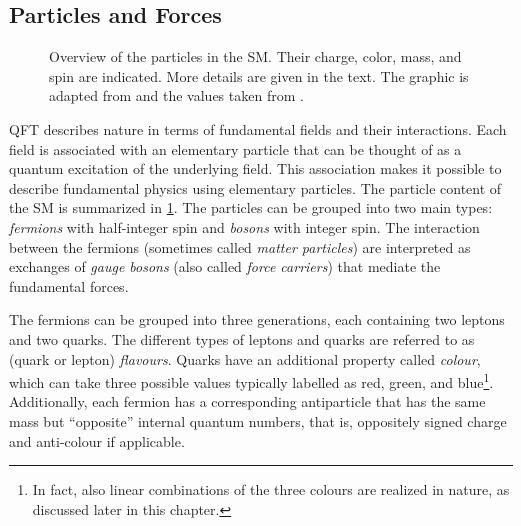 \subsection{Particles and Forces}
\label{subsec:particle-content}

\begin{figure}
  \caption[Overview of particles in the SM.]{Overview of the particles in the SM. Their charge, color, mass, and spin are indicated. More details are given in the text. The graphic is adapted from  and the values taken from .}  
  \label{fig:particles-infographic}
\end{figure}

QFT describes nature in terms of fundamental fields and their interactions. Each field is associated with an elementary particle that can be thought of as a quantum excitation of the underlying field. 
This association makes it possible to describe fundamental physics using elementary particles.
The particle content of the SM is summarized in \cref{fig:particles-infographic}. The particles can be grouped into two main types: 
\emph{fermions} with half-integer spin and \emph{bosons} with integer spin. The interaction between the fermions (sometimes called \emph{matter particles}) are interpreted as exchanges of \emph{gauge bosons} (also called \emph{force carriers}) that mediate the fundamental forces. 

The fermions can be grouped into three generations, each containing two leptons and two quarks. The different types of leptons and quarks are referred to as (quark or lepton) \emph{flavours}.
Quarks have an additional property called \emph{colour}, which can take three possible values typically labelled as red, green, and blue\footnote{In fact, also linear combinations of the three colours are realized in nature, as discussed later in this chapter.}.
Additionally, each fermion has a corresponding antiparticle that has the same mass but ``opposite'' internal quantum numbers, that is, oppositely signed charge and anti-colour if applicable.


